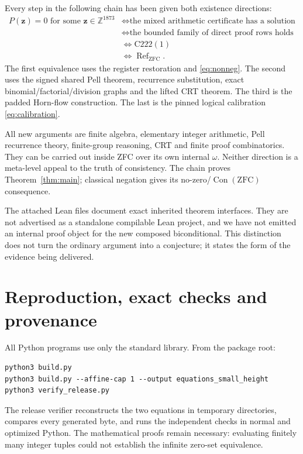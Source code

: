 \documentclass[11pt]{article}
\theoremstyle{definition}
\theoremstyle{remark}
\newcommand{\ZZ}{\mathbb Z}
\newcommand{\Con}{\operatorname{Con}}
\newcommand{\Refut}{\operatorname{Ref}}
\begin{document}
Every step in the following chain has been given both existence directions:
\begin{align*}
 P(\mathbf z)=0\text{ for some }\mathbf z\in\ZZ^{1873}
 &\iff \text{the mixed arithmetic certificate has a solution}\\
 &\iff \text{the bounded family of direct proof rows holds}\\
 &\iff \mathrm{C222}(1)\\
 &\iff \Refut_{\mathrm{ZFC}}.
\end{align*}
The first equivalence uses the register restoration and
\eqref{eq:nonneg}. The second uses the signed shared Pell theorem,
recurrence substitution, exact binomial/factorial/division graphs and
the lifted CRT theorem. The third is the padded Horn-flow construction.
The last is the pinned logical calibration \eqref{eq:calibration}.

All new arguments are finite algebra, elementary integer arithmetic,
Pell recurrence theory, finite-group reasoning, CRT and finite proof
combinatorics. They can be carried out inside ZFC over its own internal
$\omega$. Neither direction is a meta-level appeal to the truth of
consistency. The chain proves Theorem~\ref{thm:main}; classical negation
gives its no-zero/$\Con(\mathrm{ZFC})$ consequence.

The attached Lean files document exact inherited theorem interfaces.
They are not advertised as a standalone compilable Lean project, and
we have not emitted an internal proof object for the new composed
biconditional. This distinction does not turn the ordinary argument
into a conjecture; it states the form of the evidence being delivered.

\section{Reproduction, exact checks and provenance}

All Python programs use only the standard library. From the package root:
\begin{verbatim}
python3 build.py
python3 build.py --affine-cap 1 --output equations_small_height
python3 verify_release.py
\end{verbatim}
The release verifier reconstructs the two equations in temporary
directories, compares every generated byte, and runs the independent
checks in normal and optimized Python. The mathematical proofs remain
necessary: evaluating finitely many integer tuples could not establish
the infinite zero-set equivalence.
\end{document}
